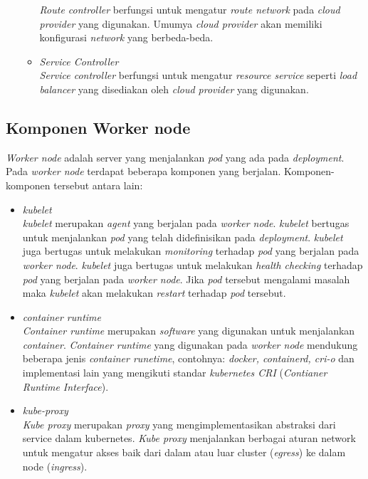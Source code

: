 \begin{itemize}
\begin{itemize}
                    \textit{Route controller} berfungsi untuk mengatur \textit{route network} pada \textit{cloud provider} yang digunakan.
                    Umumya \textit{cloud provider} akan memiliki konfigurasi \textit{network} yang berbeda-beda.
              \item \textit{Service Controller} \\
                    \textit{Service controller} berfungsi untuk mengatur \textit{resource service} seperti \textit{load balancer}
                    yang disediakan oleh \textit{cloud provider} yang digunakan.
          \end{itemize}
\end{itemize}

\vspace{0.5cm}
\subsection{Komponen Worker node} \label{subsec:Komponen Worker Node}
\textit{Worker node} adalah server yang menjalankan \textit{pod} yang ada pada \textit{deployment}.
Pada \textit{worker node} terdapat beberapa komponen yang berjalan. Komponen-komponen tersebut antara lain:
\begin{itemize}
    \item \textit{kubelet} \\
          \textit{kubelet} merupakan \textit{agent} yang berjalan pada \textit{worker node}.
          \textit{kubelet} bertugas untuk menjalankan \textit{pod} yang telah didefinisikan pada \textit{deployment}.
          \textit{kubelet} juga bertugas untuk melakukan \textit{monitoring} terhadap \textit{pod} yang berjalan pada \textit{worker node}.
          \textit{kubelet} juga bertugas untuk melakukan \textit{health checking} terhadap \textit{pod} yang berjalan pada \textit{worker node}.
          Jika \textit{pod} tersebut mengalami masalah maka \textit{kubelet} akan melakukan \textit{restart} terhadap \textit{pod} tersebut.
    \item \textit{container runtime} \\
          \textit{Container runtime} merupakan \textit{software} yang digunakan untuk menjalankan \textit{container}.
          \textit{Container runtime} yang digunakan pada \textit{worker node} mendukung beberapa jenis \textit{container runetime},
          contohnya: \textit{docker, containerd, cri-o} dan implementasi lain yang mengikuti standar \textit{kubernetes CRI} (\textit{Contianer Runtime Interface}).
    \item \textit{kube-proxy} \\
          \textit{Kube proxy} merupakan \textit{proxy} yang mengimplementasikan abstraksi dari
          service dalam kubernetes. \textit{Kube proxy} menjalankan berbagai aturan network
          untuk mengatur akses baik dari dalam atau luar cluster (\textit{egress}) ke dalam node (\textit{ingress}).
\end{itemize}

